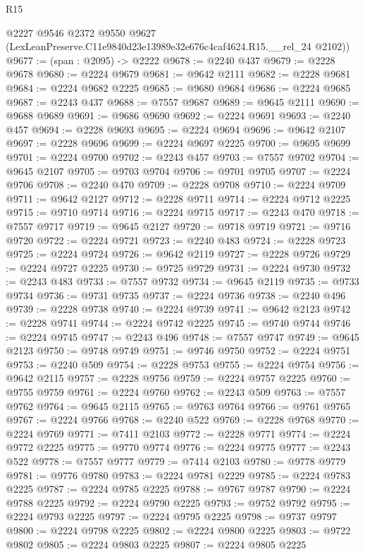 \begin{lexlean}{R15}
\begin{coremodule}
      @2227
      @9546
      @2372
      @9550
      @9627
      (LexLeanPreserve.C11e9840d23e13989e32e676c4caf4624.R15.__rel_24 @2102))
@9677 := (span : @2095) -> @2222
@9678 := @2240 @437
@9679 := @2228 @9678
@9680 := @2224 @9679
@9681 := @9642 @2111
@9682 := @2228 @9681
@9684 := @2224 @9682 @2225
@9685 := @9680 @9684
@9686 := @2224 @9685
@9687 := @2243 @437
@9688 := @7557 @9687
@9689 := @9645 @2111
@9690 := @9688 @9689
@9691 := @9686 @9690
@9692 := @2224 @9691
@9693 := @2240 @457
@9694 := @2228 @9693
@9695 := @2224 @9694
@9696 := @9642 @2107
@9697 := @2228 @9696
@9699 := @2224 @9697 @2225
@9700 := @9695 @9699
@9701 := @2224 @9700
@9702 := @2243 @457
@9703 := @7557 @9702
@9704 := @9645 @2107
@9705 := @9703 @9704
@9706 := @9701 @9705
@9707 := @2224 @9706
@9708 := @2240 @470
@9709 := @2228 @9708
@9710 := @2224 @9709
@9711 := @9642 @2127
@9712 := @2228 @9711
@9714 := @2224 @9712 @2225
@9715 := @9710 @9714
@9716 := @2224 @9715
@9717 := @2243 @470
@9718 := @7557 @9717
@9719 := @9645 @2127
@9720 := @9718 @9719
@9721 := @9716 @9720
@9722 := @2224 @9721
@9723 := @2240 @483
@9724 := @2228 @9723
@9725 := @2224 @9724
@9726 := @9642 @2119
@9727 := @2228 @9726
@9729 := @2224 @9727 @2225
@9730 := @9725 @9729
@9731 := @2224 @9730
@9732 := @2243 @483
@9733 := @7557 @9732
@9734 := @9645 @2119
@9735 := @9733 @9734
@9736 := @9731 @9735
@9737 := @2224 @9736
@9738 := @2240 @496
@9739 := @2228 @9738
@9740 := @2224 @9739
@9741 := @9642 @2123
@9742 := @2228 @9741
@9744 := @2224 @9742 @2225
@9745 := @9740 @9744
@9746 := @2224 @9745
@9747 := @2243 @496
@9748 := @7557 @9747
@9749 := @9645 @2123
@9750 := @9748 @9749
@9751 := @9746 @9750
@9752 := @2224 @9751
@9753 := @2240 @509
@9754 := @2228 @9753
@9755 := @2224 @9754
@9756 := @9642 @2115
@9757 := @2228 @9756
@9759 := @2224 @9757 @2225
@9760 := @9755 @9759
@9761 := @2224 @9760
@9762 := @2243 @509
@9763 := @7557 @9762
@9764 := @9645 @2115
@9765 := @9763 @9764
@9766 := @9761 @9765
@9767 := @2224 @9766
@9768 := @2240 @522
@9769 := @2228 @9768
@9770 := @2224 @9769
@9771 := @7411 @2103
@9772 := @2228 @9771
@9774 := @2224 @9772 @2225
@9775 := @9770 @9774
@9776 := @2224 @9775
@9777 := @2243 @522
@9778 := @7557 @9777
@9779 := @7414 @2103
@9780 := @9778 @9779
@9781 := @9776 @9780
@9783 := @2224 @9781 @2229
@9785 := @2224 @9783 @2225
@9787 := @2224 @9785 @2225
@9788 := @9767 @9787
@9790 := @2224 @9788 @2225
@9792 := @2224 @9790 @2225
@9793 := @9752 @9792
@9795 := @2224 @9793 @2225
@9797 := @2224 @9795 @2225
@9798 := @9737 @9797
@9800 := @2224 @9798 @2225
@9802 := @2224 @9800 @2225
@9803 := @9722 @9802
@9805 := @2224 @9803 @2225
@9807 := @2224 @9805 @2225

\end{coremodule}
\end{lexlean}
